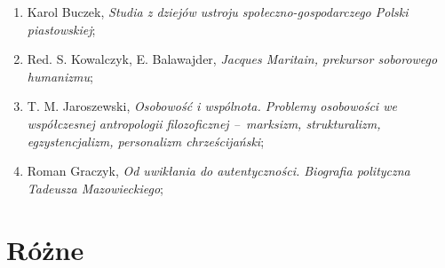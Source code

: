 \documentclass[a4paper,11pt]{article}
\begin{document}
\begin{enumerate}
\item Karol Buczek, \emph{Studia z dziejów ustroju
    społeczno-gospodarczego Polski piastowskiej};
\item Red. S. Kowalczyk, E. Balawajder, \emph{Jacques Maritain,
    prekursor soborowego humanizmu};
\item T. M. Jaroszewski, \emph{Osobowość i wspólnota. Problemy
    osobowości we współczesnej antropologii filozoficznej --~marksizm,
    strukturalizm, egzystencjalizm, personalizm chrześcijański};
\item Roman Graczyk, \emph{Od uwikłania do autentyczności. Biografia
    polityczna Tadeusza Mazowieckiego};
\end{enumerate}





\newpage
\section{Różne}
\end{document}
